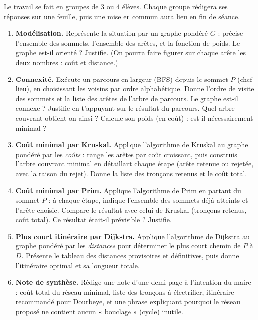 \documentclass[11pt]{article}
\newcounter{popsec}
\newcounter{popsub}
\newcommand{\courssub}[1]{%
  \stepcounter{popsub}%
  \par\vspace{9pt}\noindent{\popxbold\fontsize{11.5}{13}\selectfont\color{popink}{\color{poporange}\thepopsec.\thepopsub}\hspace{6pt}#1}\par\nopagebreak\vspace{4pt}
}
\begin{document}
Le travail se fait en groupes de 3 ou 4 élèves. Chaque groupe rédigera ses réponses sur une feuille, puis une mise en commun aura lieu en fin de séance.

\begin{enumerate}
\item \textbf{Modélisation.} Représente la situation par un graphe pondéré $G$ : précise l'ensemble des sommets, l'ensemble des arêtes, et la fonction de poids. Le graphe est-il orienté ? Justifie. (On pourra faire figurer sur chaque arête les deux nombres : coût et distance.)
\item \textbf{Connexité.} Exécute un parcours en largeur (BFS) depuis le sommet $P$ (chef-lieu), en choisissant les voisins par ordre alphabétique. Donne l'ordre de visite des sommets et la liste des arêtes de l'arbre de parcours. Le graphe est-il connexe ? Justifie en t'appuyant sur le résultat du parcours. Quel arbre couvrant obtient-on ainsi ? Calcule son poids (en coût) : est-il nécessairement minimal ?
\item \textbf{Coût minimal par Kruskal.} Applique l'algorithme de Kruskal au graphe pondéré par les \emph{coûts} : range les arêtes par coût croissant, puis construis l'arbre couvrant minimal en détaillant chaque étape (arête retenue ou rejetée, avec la raison du rejet). Donne la liste des tronçons retenus et le coût total.
\item \textbf{Coût minimal par Prim.} Applique l'algorithme de Prim en partant du sommet $P$ : à chaque étape, indique l'ensemble des sommets déjà atteints et l'arête choisie. Compare le résultat avec celui de Kruskal (tronçons retenus, coût total). Ce résultat était-il prévisible ? Justifie.
\item \textbf{Plus court itinéraire par Dijkstra.} Applique l'algorithme de Dijkstra au graphe pondéré par les \emph{distances} pour déterminer le plus court chemin de $P$ à $D$. Présente le tableau des distances provisoires et définitives, puis donne l'itinéraire optimal et sa longueur totale.
\item \textbf{Note de synthèse.} Rédige une note d'une demi-page à l'intention du maire : coût total du réseau minimal, liste des tronçons à électrifier, itinéraire recommandé pour Dourbeye, et une phrase expliquant pourquoi le réseau proposé ne contient aucun « bouclage » (cycle) inutile.
\end{enumerate}

\courssub{Ressources à mobiliser}
\end{document}
